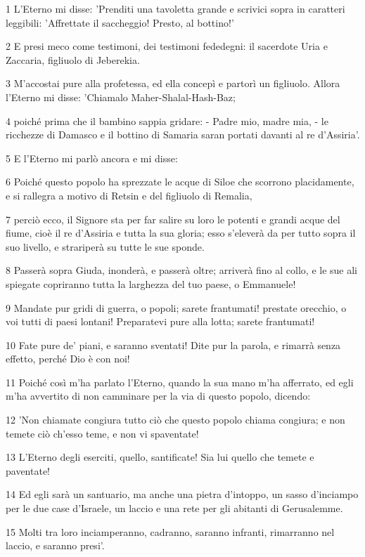 \par 1 L'Eterno mi disse: 'Prenditi una tavoletta grande e scrivici sopra in caratteri leggibili: 'Affrettate il saccheggio! Presto, al bottino!'
\par 2 E presi meco come testimoni, dei testimoni fededegni: il sacerdote Uria e Zaccaria, figliuolo di Jeberekia.
\par 3 M'accostai pure alla profetessa, ed ella concepì e partorì un figliuolo. Allora l'Eterno mi disse: 'Chiamalo Maher-Shalal-Hash-Baz;
\par 4 poiché prima che il bambino sappia gridare: - Padre mio, madre mia, - le ricchezze di Damasco e il bottino di Samaria saran portati davanti al re d'Assiria'.
\par 5 E l'Eterno mi parlò ancora e mi disse:
\par 6 Poiché questo popolo ha sprezzate le acque di Siloe che scorrono placidamente, e si rallegra a motivo di Retsin e del figliuolo di Remalia,
\par 7 perciò ecco, il Signore sta per far salire su loro le potenti e grandi acque del fiume, cioè il re d'Assiria e tutta la sua gloria; esso s'eleverà da per tutto sopra il suo livello, e strariperà su tutte le sue sponde.
\par 8 Passerà sopra Giuda, inonderà, e passerà oltre; arriverà fino al collo, e le sue ali spiegate copriranno tutta la larghezza del tuo paese, o Emmanuele!
\par 9 Mandate pur gridi di guerra, o popoli; sarete frantumati! prestate orecchio, o voi tutti di paesi lontani! Preparatevi pure alla lotta; sarete frantumati!
\par 10 Fate pure de' piani, e saranno sventati! Dite pur la parola, e rimarrà senza effetto, perché Dio è con noi!
\par 11 Poiché così m'ha parlato l'Eterno, quando la sua mano m'ha afferrato, ed egli m'ha avvertito di non camminare per la via di questo popolo, dicendo:
\par 12 'Non chiamate congiura tutto ciò che questo popolo chiama congiura; e non temete ciò ch'esso teme, e non vi spaventate!
\par 13 L'Eterno degli eserciti, quello, santificate! Sia lui quello che temete e paventate!
\par 14 Ed egli sarà un santuario, ma anche una pietra d'intoppo, un sasso d'inciampo per le due case d'Israele, un laccio e una rete per gli abitanti di Gerusalemme.
\par 15 Molti tra loro inciamperanno, cadranno, saranno infranti, rimarranno nel laccio, e saranno presi'.
